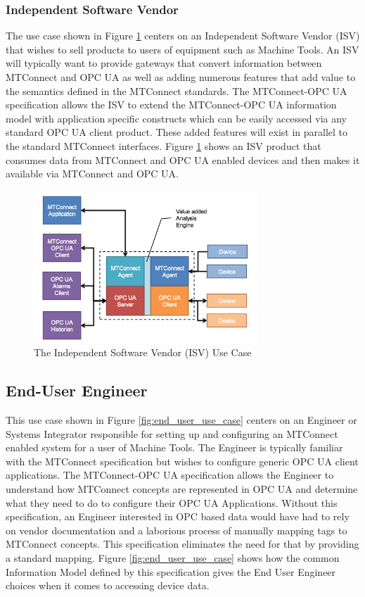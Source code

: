 \documentclass{mtconnect}	%
\begin{document}
\FloatBarrier

\subsubsection{Independent Software Vendor}

The use case shown in Figure \ref{fig:isv_use_case} centers on an Independent Software Vendor (ISV) that wishes to sell products to users of equipment such as Machine Tools. An ISV will typically want to provide gateways that convert information between MTConnect and OPC UA as well as adding numerous features that add value to the semantics defined in the MTConnect standards. The MTConnect-OPC UA specification allows the ISV to extend the MTConnect-OPC UA information model with application specific constructs which can be easily accessed via any standard OPC UA client product. These added features will exist in parallel to the standard MTConnect interfaces. Figure \ref{fig:isv_use_case} shows an ISV product that consumes data from MTConnect and OPC UA enabled devices and then makes it available via MTConnect and OPC UA.

\begin{figure}[h]
  \centering
  \includegraphics[width=0.75\textwidth]{diagrams/ISVUseCase.png}
  \caption{The Independent Software Vendor (ISV) Use Case}
  \label{fig:isv_use_case}
\end{figure}

\subsection{End-User Engineer}

This use case shown in Figure \ref{fig:end_user_use_case} centers on an Engineer or Systems Integrator responsible for setting up and configuring an MTConnect enabled system for a user of Machine Tools. The Engineer is typically familiar with the MTConnect specification but wishes to configure generic OPC UA client applications. The MTConnect-OPC UA specification allows the Engineer to understand how MTConnect concepts are represented in OPC UA and determine what they need to do to configure their OPC UA Applications. Without this specification, an Engineer interested in OPC based data would have had to rely on vendor documentation and a laborious process of manually mapping tags to MTConnect concepts. This specification eliminates the need for that by providing a standard mapping. Figure \ref{fig:end_user_use_case} shows how the common Information Model defined by this specification gives the End User Engineer choices when it comes to accessing device data.\
\end{document}
